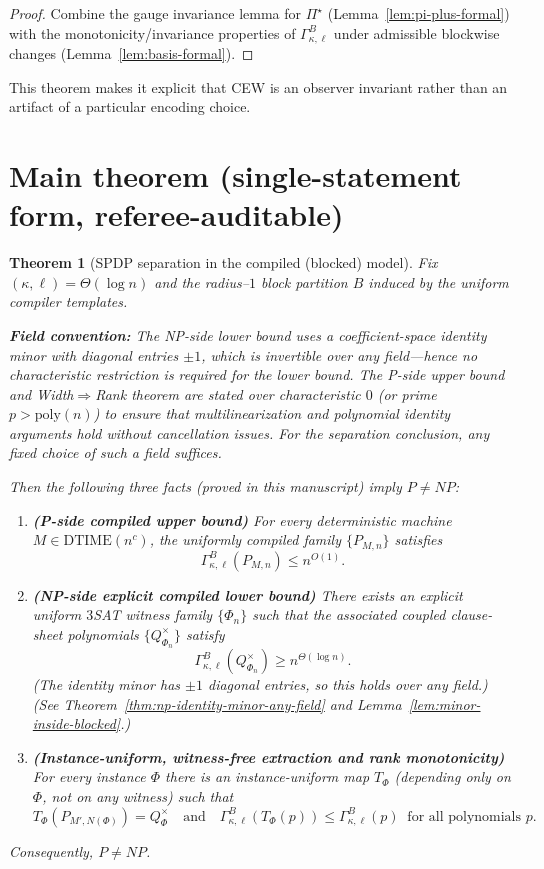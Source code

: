 \documentclass[12pt]{article}
\newtheorem{theorem}{Theorem}
\theoremstyle{definition}
\theoremstyle{definition}
\theoremstyle{remark}
\theoremstyle{remark}
\begin{document}
\begin{proof}
Combine the gauge invariance lemma for $\Pi^\star$ (Lemma~\ref{lem:pi-plus-formal}) with the monotonicity/invariance
properties of $\Gamma^{B}_{\kappa,\ell}$ under admissible blockwise changes (Lemma~\ref{lem:basis-formal}).
\end{proof}

This theorem makes it explicit that CEW is an observer invariant rather than an artifact of a particular encoding choice.

\section{Main theorem (single-statement form, referee-auditable)}
\label{sec:main-theorem-single-statement}

\begin{theorem}[SPDP separation in the compiled (blocked) model]
\label{thm:spdp-separation-compiled}\label{thm:main-single}
Fix $(\kappa,\ell)=\Theta(\log n)$ and the radius--$1$ block partition $B$ induced by the
uniform compiler templates.

\textbf{Field convention:} The NP-side lower bound uses a coefficient-space identity minor with diagonal entries $\pm 1$, which is invertible over any field---hence no characteristic restriction is required for the lower bound. The P-side upper bound and Width$\Rightarrow$Rank theorem are stated over characteristic $0$ (or prime $p > \mathrm{poly}(n)$) to ensure that multilinearization and polynomial identity arguments hold without cancellation issues. For the separation conclusion, any fixed choice of such a field suffices.

Then the following three facts (proved in this manuscript) imply $P\neq NP$:
\begin{enumerate}
\item \textbf{(P-side compiled upper bound)}
For every deterministic machine $M\in \mathrm{DTIME}(n^c)$, the uniformly compiled family
$\{P_{M,n}\}$ satisfies
\[
\Gamma^{B}_{\kappa,\ell}(P_{M,n}) \le n^{O(1)}.
\]

\item \textbf{(NP-side explicit compiled lower bound)}
There exists an explicit uniform $3$SAT witness family $\{\Phi_n\}$ such that the associated
coupled clause-sheet polynomials $\{Q^{\times}_{\Phi_n}\}$ satisfy
\[
\Gamma^{B}_{\kappa,\ell}(Q^{\times}_{\Phi_n}) \ge n^{\Theta(\log n)}.
\]
(The identity minor has $\pm 1$ diagonal entries, so this holds over any field.)
(See Theorem~\ref{thm:np-identity-minor-any-field} and Lemma~\ref{lem:minor-inside-blocked}.)

\item \textbf{(Instance-uniform, witness-free extraction and rank monotonicity)}
For every instance $\Phi$ there is an instance-uniform map $T_\Phi$ (depending only on $\Phi$,
not on any witness) such that
\[
T_\Phi(P_{M',N(\Phi)}) = Q^{\times}_\Phi
\quad\text{and}\quad
\Gamma^{B}_{\kappa,\ell}(T_\Phi(p)) \le \Gamma^{B}_{\kappa,\ell}(p)
\ \text{ for all polynomials } p.
\]
\end{enumerate}
Consequently, $P\neq NP$.
\end{theorem}
\end{document}
